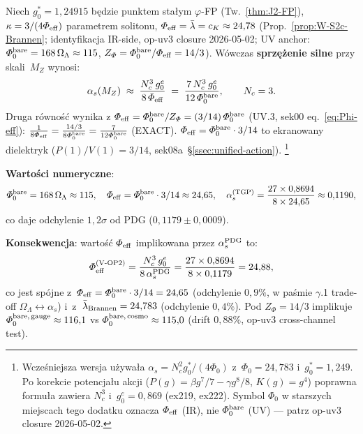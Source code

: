 \begin{proposition}%
\label{prop:V-alphas-substrate}
Niech $g_0^* = 1{,}24915$ b\k{e}dzie punktem sta\l{}ym $\varphi$-FP
(Tw.~\ref{thm:J2-FP}), $\kappa = 3/(4\Phi_{\rm eff})$ parametrem solitonu,
$\Phi_{\rm eff} = \bar\lambda = c_K \approx 24{,}78$
(Prop.~\ref{prop:W-S2c-Brannen}; identyfikacja IR-side, op-uv3 closure
2026-05-02; UV anchor: $\Phi_0^{\rm bare} = 168\,\Omega_\Lambda \approx 115$,
$Z_\Phi = \Phi_0^{\rm bare}/\Phi_{\rm eff} = 14/3$).
W\'owczas \textbf{sprzężenie silne} przy skali~$M_Z$ wynosi:
\begin{equation}\label{eq:V-alphas-formula}
  \alpha_s(M_Z)
  \;\approx\;
  \frac{N_c^3\,g_0^e}{8\,\Phi_{\rm eff}}
  \;=\;
  \frac{7\,N_c^3\,g_0^e}{12\,\Phi_0^{\rm bare}},
  \qquad
  N_c = 3.
\end{equation}
Druga r\'owno\'s\'c wynika z $\Phi_{\rm eff} = \Phi_0^{\rm bare}/Z_\Phi
= (3/14)\,\Phi_0^{\rm bare}$ (UV.3, sek00 eq.~\eqref{eq:Phi-eff}):
$\frac{1}{8\Phi_{\rm eff}} = \frac{14/3}{8\Phi_0^{\rm bare}}
= \frac{7}{12\Phi_0^{\rm bare}}$ (EXACT).
$\Phi_{\rm eff} = \Phi_0^{\rm bare} \cdot 3/14$ to ekranowany dielektryk
($P(1)/V(1) = 3/14$, sek08a~\S\ref{ssec:unified-action}).%
\footnote{Wcze\'sniejsza wersja u\.zywa\l{}a
$\alpha_s = N_c^2 g_0^*/(4\Phi_0)$ z~$\Phi_0 = 24{,}783$ i~$g_0^* = 1{,}249$.
Po korekcie potencja\l{}u akcji ($P(g) = \beta g^7/7 - \gamma g^8/8$,
$K(g) = g^4$) poprawna formu\l{}a zawiera $N_c^3$ i~$g_0^e = 0{,}869$
(ex219, ex222). Symbol $\Phi_0$ w starszych miejscach tego dodatku
oznacza $\Phi_{\rm eff}$ (IR), nie $\Phi_0^{\rm bare}$ (UV) --- patrz
op-uv3 closure 2026-05-02.}

\noindent\textbf{Warto\'sci numeryczne}:
\[
  \Phi_0^{\rm bare} = 168\,\Omega_\Lambda \approx 115,
  \quad
  \Phi_{\rm eff} = \Phi_0^{\rm bare} \cdot 3/14 \approx 24{,}65,
  \quad
  \alpha_s^{(\mathrm{TGP})} = \frac{27 \times 0{,}8694}{8 \times 24{,}65}
  \approx 0{,}1190,
\]
co daje odchylenie $1{,}2\sigma$ od PDG ($0{,}1179 \pm 0{,}0009$).

\textbf{Konsekwencja}: warto\'s\'c $\Phi_{\rm eff}$ impliko\-wana przez
$\alpha_s^{\rm PDG}$ to:
\begin{equation}\label{eq:V-Phi0-VOP2}
  \Phi_{\rm eff}^{(\mathrm{V\text{-}OP2})}
  = \frac{N_c^3\,g_0^e}{8\,\alpha_s^{\rm PDG}}
  = \frac{27 \times 0{,}8694}{8 \times 0{,}1179}
  = 24{,}88,
\end{equation}
co jest sp\'ojne z~$\Phi_{\rm eff} = \Phi_0^{\rm bare} \cdot 3/14 = 24{,}65$
(odchylenie $0{,}9\%$, w pa\'smie $\gamma$.1 trade-off
$\Omega_\Lambda \leftrightarrow \alpha_s$)
i~z~$\bar\lambda_{\rm Brannen} = 24{,}783$ (odchylenie $0{,}4\%$).
Pod $Z_\Phi = 14/3$ implikuje $\Phi_0^{\rm bare,\,gauge} \approx 116{,}1$
vs $\Phi_0^{\rm bare,\,cosmo} \approx 115{,}0$ (drift $0{,}88\%$,
op-uv3 cross-channel test).


\end{proposition}
